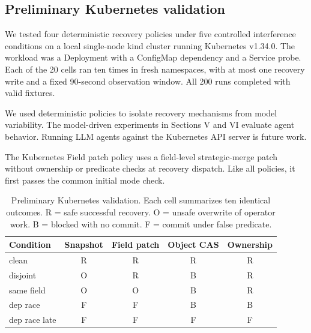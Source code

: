 \documentclass[conference,10pt]{IEEEtran}
\begin{document}
\subsection{Preliminary Kubernetes validation}

We tested four deterministic recovery policies under five controlled interference conditions on a local single-node kind cluster running Kubernetes v1.34.0. The workload was a Deployment with a ConfigMap dependency and a Service probe. Each of the 20 cells ran ten times in fresh namespaces, with at most one recovery write and a fixed 90-second observation window. All 200 runs completed with valid fixtures.

We used deterministic policies to isolate recovery mechanisms from model variability. The model-driven experiments in Sections V and VI evaluate agent behavior. Running LLM agents against the Kubernetes API server is future work.

The Kubernetes Field patch policy uses a field-level strategic-merge patch without ownership or predicate checks at recovery dispatch. Like all policies, it first passes the common initial mode check.

\begin{table}[!t]

\caption{Preliminary Kubernetes validation. Each cell summarizes ten identical outcomes. R = safe successful recovery. O = unsafe overwrite of operator work. B = blocked with no commit. F = commit under false predicate.}

\label{tab:4}

\centering\footnotesize

\setlength{\tabcolsep}{3pt}

\renewcommand{\arraystretch}{1.12}

\begin{tabular}{@{}lcccc@{}}

\toprule

Condition & Snapshot & Field patch & Object CAS & Ownership \\

\midrule

clean & R & R & R & R \\

disjoint & O & R & B & R \\

same field & O & O & B & R \\

dep race & F & F & B & B \\

dep race late & F & F & F & F \\

\bottomrule

\end{tabular}

\end{table}
\end{document}
